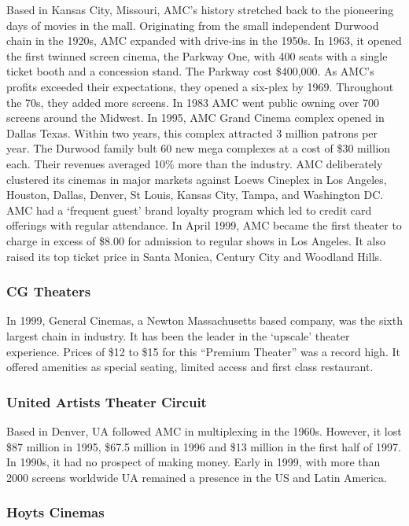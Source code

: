 \documentclass[12pt]{article}
\begin{document}
Based in Kansas City, Missouri, AMC’s history stretched back to the pioneering days of movies in the mall. Originating from the small independent Durwood chain in the 1920s, AMC expanded with drive-ins in the 1950s. In 1963, it opened the first twinned screen cinema, the Parkway One, with 400 seats with a single ticket booth and a concession stand. The Parkway cost \$400,000. As AMC’s profits exceeded  their expectations, they opened a six-plex by 1969. Throughout the 70s, they added more screens. In 1983 AMC went public owning over 700 screens around the Midwest. In 1995, AMC Grand Cinema complex opened in Dallas Texas. Within two years, this complex attracted 3 million patrons per year. The Durwood family bult 60 new mega complexes at a cost of \$30 million each. Their revenues averaged 10\% more than the industry. AMC deliberately clustered its cinemas in major markets against Loews Cineplex in Los Angeles, Houston, Dallas, Denver, St  Louis, Kansas City, Tampa, and Washington DC. AMC had a ‘frequent guest’ brand loyalty program which led to credit card offerings with regular attendance. In April 1999, AMC became the first theater to charge in excess of \$8.00 for admission to regular shows in Los Angeles. It also raised its top ticket price in Santa Monica, Century City and Woodland Hills. 

\subsubsection{CG Theaters}

In 1999, General Cinemas, a Newton Massachusetts based company, was the sixth largest chain in industry. It has been the leader in the ‘upscale’ theater experience. Prices of \$12 to \$15 for this “Premium Theater” was a record high. It offered amenities as special seating, limited access and first class restaurant. 

\subsubsection{United Artists Theater Circuit }

Based in Denver, UA followed AMC in multiplexing in the 1960s. However, it lost \$87 million in 1995, \$67.5 million in 1996 and \$13 million in the first half of 1997. In 1990s, it had no prospect of making money. Early in 1999, with more than 2000 screens worldwide UA remained a presence in the US and Latin America. 

\subsubsection{Hoyts Cinemas}
\end{document}
